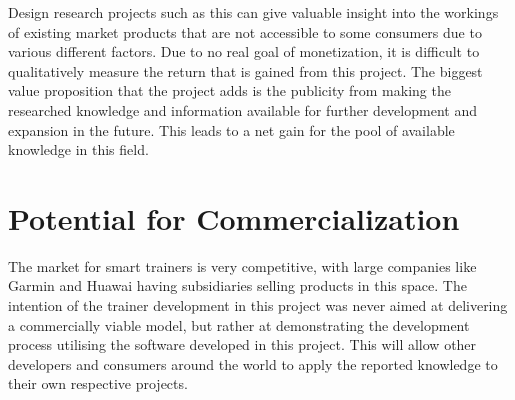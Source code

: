Design research projects such as this can give valuable insight into the workings of existing market products that are not accessible to some consumers due to various different factors. Due to no real goal of monetization, it is difficult to qualitatively measure the return that is gained from this project. The biggest value proposition that the project adds is the publicity from making the researched knowledge and information available for further development and expansion in the future. This leads to a net gain for the pool of available knowledge in this field.

\section{Potential for Commercialization}

The market for smart trainers is very competitive, with large companies like Garmin and Huawai having subsidiaries selling products in this space. The intention of the trainer development in this project was never aimed at delivering a commercially viable model, but rather at demonstrating the development process utilising the software developed in this project. This will allow other developers and consumers around the world to apply the reported knowledge to their own respective projects.